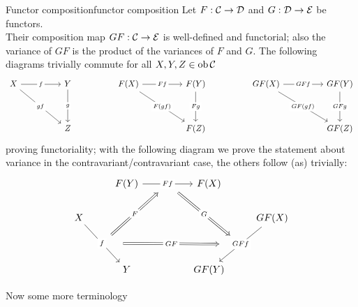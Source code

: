 \documentclass{article}
\begin{document}
\begin{proposition}{Functor composition}{functor composition}
    Let $F : \mathcal{C}\to \mathcal{D}$ and $G : \mathcal{D}\to\mathcal{E}$ be functors.\\
    Their composition map $GF : \mathcal{C}\to \mathcal{E}$ is well-defined and functorial; also the variance of $GF$ is the product of the variances of $F$ and $G$.
    \proof 
    The following diagrams trivially commute for all $X,Y,Z \in \operatorname{ob}\mathcal{C}$
    \[\begin{tikzcd}
	    X && Y && {F(X)} && {F(Y)} && {GF(X)} && {GF(Y)} \\
	    \\
	    && Z &&&& {F(Z)} &&&& {GF(Z)}
    	\arrow["f"{description}, from=1-1, to=1-3]
	    \arrow["gf"{description}, from=1-1, to=3-3]
    	\arrow["g"{description}, from=1-3, to=3-3]
    	\arrow["Ff"{description}, from=1-5, to=1-7]
    	\arrow["{F(gf)}"{description}, from=1-5, to=3-7]
    	\arrow["Fg"{description}, from=1-7, to=3-7]
    	\arrow["GFf"{description}, from=1-9, to=1-11]
    	\arrow["{GF(gf)}"{description}, from=1-9, to=3-11]
    	\arrow["GFg"{description}, from=1-11, to=3-11]
    \end{tikzcd}\]
    proving functoriality; with the following diagram we prove the statement about variance in the contravariant/contravariant case, the others follow (as) trivially:
    \[\begin{tikzcd}
	    & {F(Y)} && {F(X)} \\
	    X &&&& {GF(X)} \\
	    \\
	    & Y && {GF(Y)}
	    \arrow[""{name=0, anchor=center, inner sep=0}, "Ff"{description}, from=1-2, to=1-4]
	    \arrow[""{name=1, anchor=center, inner sep=0}, "f"{description}, from=2-1, to=4-2]
	    \arrow[""{name=2, anchor=center, inner sep=0}, "GFf"{description}, from=2-5, to=4-4]
	    \arrow["G"{description}, shorten <=13pt, shorten >=13pt, Rightarrow, from=0, to=2]
	    \arrow["F"{description}, shorten <=12pt, shorten >=12pt, Rightarrow, from=1, to=0]
	    \arrow["GF"{description}, shorten <=21pt, shorten >=21pt, Rightarrow, from=1, to=2]
    \end{tikzcd}\]
\end{proposition}

Now some more terminology
\end{document}

